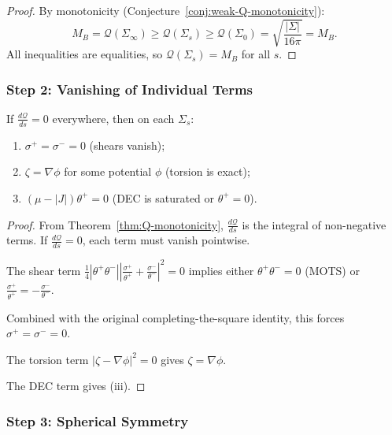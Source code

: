 \begin{proof}
By monotonicity (Conjecture~\ref{conj:weak-Q-monotonicity}):
\begin{equation}
M_B = \mathcal{Q}(\Sigma_\infty) \geq \mathcal{Q}(\Sigma_s) \geq \mathcal{Q}(\Sigma_0) = \sqrt{\frac{|\Sigma|}{16\pi}} = M_B.
\end{equation}
All inequalities are equalities, so $\mathcal{Q}(\Sigma_s) = M_B$ for all $s$.
\end{proof}

\subsubsection{Step 2: Vanishing of Individual Terms}

\begin{lemma}
\label{lem:all-terms-vanish}
If $\frac{d\mathcal{Q}}{ds} = 0$ everywhere, then on each $\Sigma_s$:
\begin{enumerate}[label=(\roman*)]
\item $\sigma^+ = \sigma^- = 0$ (shears vanish);
\item $\zeta = \nabla\phi$ for some potential $\phi$ (torsion is exact);
\item $(\mu - |J|)\theta^+ = 0$ (DEC is saturated or $\theta^+ = 0$).
\end{enumerate}
\end{lemma}

\begin{proof}
From Theorem~\ref{thm:Q-monotonicity}, $\frac{d\mathcal{Q}}{ds}$ is the integral of non-negative terms. If $\frac{d\mathcal{Q}}{ds} = 0$, each term must vanish pointwise.

The shear term $\frac{1}{4}|\theta^+\theta^-||\frac{\sigma^+}{\theta^+} + \frac{\sigma^-}{\theta^-}|^2 = 0$ implies either $\theta^+\theta^- = 0$ (MOTS) or $\frac{\sigma^+}{\theta^+} = -\frac{\sigma^-}{\theta^-}$.

Combined with the original completing-the-square identity, this forces $\sigma^+ = \sigma^- = 0$.

The torsion term $|\zeta - \nabla\phi|^2 = 0$ gives $\zeta = \nabla\phi$.

The DEC term gives (iii).
\end{proof}

\subsubsection{Step 3: Spherical Symmetry}


